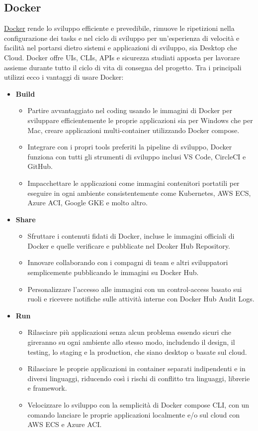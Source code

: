 \documentclass{article}
\newcommand{\docker}{\href{https://www.docker.com/}{Docker} }
\begin{document}
\subsection{Docker}
\docker rende lo sviluppo efficiente e prevedibile, rimuove le ripetizioni nella configurazione dei tasks e nel ciclo di sviluppo per un'esperienza di velocità e facilità nel portarsi dietro sistemi e applicazioni di sviluppo, sia Desktop che Cloud. Docker offre UIs, CLIs, APIs e sicurezza studiati apposta per lavorare assieme durante tutto il ciclo di vita di consegna del progetto. Tra i principali utilizzi ecco i vantaggi di usare Docker:
\begin{itemize}
	\item \textbf{Build}
	\begin{itemize}
		\item Partire avvantaggiato nel coding usando le immagini di Docker per sviluppare efficientemente le proprie applicazioni sia per Windows che per Mac, creare applicazioni multi-container utilizzando Docker compose.
		\item Integrare con i propri tools preferiti la pipeline di sviluppo, Docker funziona con tutti gli strumenti di sviluppo inclusi VS Code, CircleCI e GitHub.
		\item Impacchettare le applicazioni come immagini contenitori portatili per eseguire in ogni ambiente consistentemente come Kubernetes, AWS ECS, Azure ACI, Google GKE e molto altro.
	\end{itemize}
	\item \textbf{Share}
	\begin{itemize}
		\item Sfruttare i contenuti fidati di Docker, incluse le immagini officiali di Docker e quelle verificare e pubblicate nel Dcoker Hub Repository.
		\item Innovare collaborando con i compagni di team e altri sviluppatori semplicemente pubblicando le immagini su Docker Hub.
		\item Personalizzare l'accesso alle immagini con un control-access basato sui ruoli e ricevere notifiche sulle attività interne con Docker Hub Audit Logs.
	\end{itemize}
	\item \textbf{Run}
	\begin{itemize}
		\item Rilasciare più applicazioni senza alcun problema essendo sicuri che gireranno su ogni ambiente allo stesso modo, includendo il design, il testing, lo staging e la production, che siano desktop o basate sul cloud.
		\item Rilasciare le proprie applicazioni in container separati indipendenti e in diversi linguaggi, riducendo così i rischi di conflitto tra linguaggi, librerie e framework.
		\item Velocizzare lo sviluppo con la semplicità di Docker compose CLI, con un comando lanciare le proprie applicazioni localmente e/o sul cloud con AWS ECS e Azure ACI.
	\end{itemize}
\end{itemize}
\end{document}
